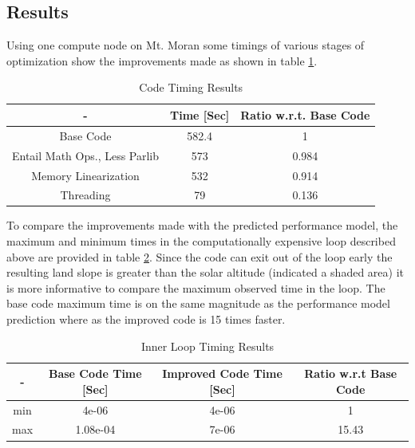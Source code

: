 \documentclass[]{article}%
\begin{document}
\subsection{Results}

Using one compute node on Mt. Moran some timings of various stages of optimization show the improvements made as shown in table \ref{table:code_timing}.

\begin{table}[ht]
\caption{Code Timing Results}
\centering
\begin{tabular}{c c c}
\hline\hline
 - & Time [Sec]& Ratio w.r.t. Base Code \\ [0.5ex] 
\hline
Base Code & 582.4 & 1 \\ 
Entail Math Ops., Less Parlib & 573 & 0.984\\
Memory Linearization & 532 & 0.914\\
Threading & 79 & 0.136\\
\hline
\end{tabular}
\label{table:code_timing}
\end{table} 

To compare the improvements made with the predicted performance model, the maximum and minimum times in the computationally expensive loop described above are provided in table \ref{table:loop_timing}. Since the code can exit out of the loop early the resulting land slope is greater than the solar altitude (indicated a shaded area) it is more informative to compare the maximum observed time in the loop. The base code maximum time is on the same magnitude as the performance model prediction where as the improved code is 15 times faster.

\begin{table}[ht]
\caption{Inner Loop Timing Results}
\centering
\begin{tabular}{c c c c}
\hline\hline
 - & Base Code Time [Sec] &  Improved Code Time [Sec]  & Ratio w.r.t Base Code\\ [0.5ex] 
\hline
min & 4e-06 & 4e-06 & 1 \\ 
max & 1.08e-04 & 7e-06 & 15.43\\

\hline
\end{tabular}
\label{table:loop_timing}
\end{table} 


\end{document}

